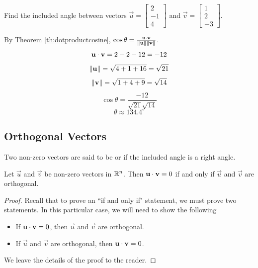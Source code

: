 \documentclass{ximera}
\begin{document}
\begin{example}\label{ex:anglebetweenvectors}
Find the included angle between vectors $\vec{u}=\begin{bmatrix}2\\-1\\4\end{bmatrix}$ and $\vec{v}=\begin{bmatrix}1\\2\\-3\end{bmatrix}$.

\begin{explanation}
By Theorem \ref{th:dotproductcosine}, $\cos \theta=\frac{\mathbf{u}\cdot \mathbf{v}}{\left\lVert\mathbf{u}\right\rVert\left\lVert\mathbf{v}\right\rVert}$.  
$$\mathbf{u}\cdot\mathbf{v}=2-2-12=-12$$
$$\left\lVert\mathbf{u}\right\rVert=\sqrt{4+1+16}=\sqrt{21}$$
$$\left\lVert\mathbf{v}\right\rVert=\sqrt{1+4+9}=\sqrt{14}$$
$$\cos\theta =\frac{-12}{\sqrt{21}\sqrt{14}}$$
$$\theta \approx 134.4^{\circ}  $$
\end{explanation}
\end{example}

\subsection*{Orthogonal Vectors}

Two non-zero vectors are said to be  or  if the included angle is a right angle.


  \begin{theorem}\label{th:orth} Let $\vec{u}$ and $\vec{v}$ be non-zero vectors in $\mathbb{R}^n$. Then $\mathbf{u}\cdot \mathbf{v}=0$ if and only if $\vec{u}$ and $\vec{v}$ are orthogonal.
\end{theorem}


\begin{proof} Recall that to prove an ``if and only if" statement, we must prove two statements.  In this particular case, we will need to show the following
\begin{itemize}
\item If $\mathbf{u}\cdot \mathbf{v}=0$, then $\vec{u}$ and $\vec{v}$ are orthogonal.
\item If $\vec{u}$ and $\vec{v}$ are orthogonal, then $\mathbf{u}\cdot \mathbf{v}=0$.
\end{itemize}
We leave the details of the proof to the reader.
\end{proof}
\end{document}
